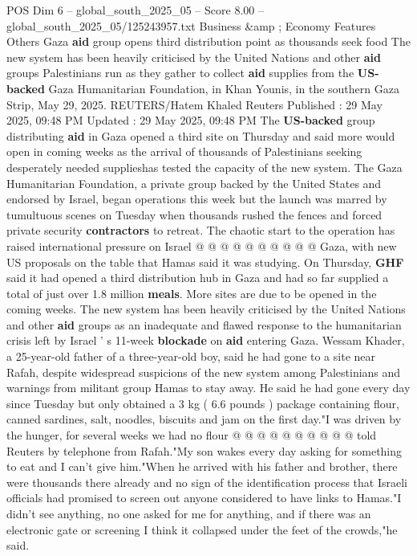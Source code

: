 \begin{textsample}{POS Dim 6 – global\_south\_2025\_05 – Score 8.00 – global\_south\_2025\_05/125243957.txt}  \label{ex:f6_pos_057}
Business \&amp ; Economy Features Others Gaza \textbf{aid} group opens third distribution point as thousands seek food The new system has been heavily criticised by the United Nations and other \textbf{aid} groups Palestinians run as they gather to collect \textbf{aid} supplies from the \textbf{US-backed} Gaza Humanitarian Foundation, in Khan Younis, in the southern Gaza Strip, May 29, 2025.
REUTERS/Hatem Khaled Reuters Published : 29 May 2025, 09:48 PM Updated : 29 May 2025, 09:48 PM The \textbf{US-backed} group distributing \textbf{aid} in Gaza opened a third site on Thursday and said more would open in coming weeks as the arrival of thousands of Palestinians seeking desperately needed supplieshas tested the capacity of the new system.
The Gaza Humanitarian Foundation, a private group backed by the United States and endorsed by Israel, began operations this week but the launch was marred by tumultuous scenes on Tuesday when thousands rushed the fences and forced private security \textbf{contractors} to retreat.
The chaotic start to the operation has raised international pressure on Israel @ @ @ @ @ @ @ @ @ @ Gaza, with new US proposals on the table that Hamas said it was studying.
On Thursday, \textbf{GHF} said it had opened a third distribution hub in Gaza and had so far supplied a total of just over 1.8 million \textbf{meals}.
More sites are due to be opened in the coming weeks.
The new system has been heavily criticised by the United Nations and other \textbf{aid} groups as an inadequate and flawed response to the humanitarian crisis left by Israel ' s 11-week \textbf{blockade} on \textbf{aid} entering Gaza.
Wessam Khader, a 25-year-old father of a three-year-old boy, said he had gone to a site near Rafah, despite widespread suspicions of the new system among Palestinians and warnings from militant group Hamas to stay away.
He said he had gone every day since Tuesday but only obtained a 3 kg ( 6.6 pounds ) package containing flour, canned sardines, salt, noodles, biscuits and jam on the first day."I was driven by the hunger, for several weeks we had no flour @ @ @ @ @ @ @ @ @ @ told Reuters by telephone from Rafah."My son wakes every day asking for something to eat and I can't give him."When he arrived with his father and brother, there were thousands there already and no sign of the identification process that Israeli officials had promised to screen out anyone considered to have links to Hamas."I didn't see anything, no one asked for me for anything, and if there was an electronic gate or screening I think it collapsed under the feet of the crowds,"he said.

\end{textsample}
